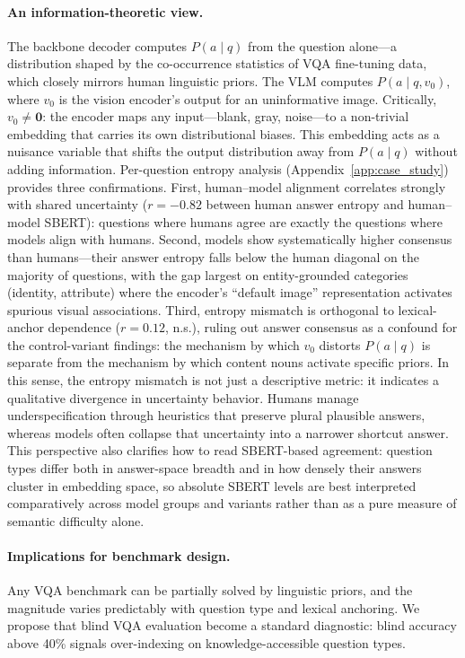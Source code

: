 \documentclass[letterpaper]{article}
\begin{document}
\paragraph{An information-theoretic view.}
The backbone decoder computes $P(a \mid q)$ from the question alone---a
distribution shaped by the co-occurrence statistics of VQA fine-tuning
data, which closely mirrors human linguistic priors. The VLM computes
$P(a \mid q, v_0)$, where $v_0$ is the vision encoder's output for an
uninformative image. Critically, $v_0 \neq \mathbf{0}$: the encoder maps
any input---blank, gray, noise---to a non-trivial embedding that
carries its own distributional biases. This embedding acts as a
nuisance variable that shifts the output distribution away from
$P(a \mid q)$ without adding information.
Per-question entropy analysis (Appendix~\ref{app:case_study}) provides
three confirmations. First, human--model alignment correlates strongly
with shared uncertainty ($r = -0.82$ between human answer entropy and
human--model SBERT): questions where humans agree are exactly the questions where
models align with humans. Second, models show systematically higher
consensus than humans---their answer entropy falls below the human
diagonal on the majority of questions, with the gap largest on
entity-grounded categories (identity, attribute) where the encoder's
``default image'' representation activates spurious visual associations.
Third, entropy mismatch is orthogonal to lexical-anchor dependence
($r = 0.12$, n.s.), ruling out answer consensus as a confound for the
control-variant findings: the mechanism by which $v_0$ distorts
$P(a \mid q)$ is separate from the mechanism by which content nouns
activate specific priors. In this sense, the entropy mismatch is not just a
descriptive metric: it indicates a qualitative divergence in uncertainty
behavior. Humans manage underspecification through heuristics that preserve
plural plausible answers, whereas models often collapse that uncertainty into
a narrower shortcut answer.
This perspective also clarifies how to read SBERT-based agreement: question
types differ both in answer-space breadth and in how densely their answers
cluster in embedding space, so absolute SBERT levels are best interpreted
comparatively across model groups and variants rather than as a pure measure
of semantic difficulty alone.

\paragraph{Implications for benchmark design.}
Any VQA benchmark can be partially solved by linguistic priors, and the
magnitude varies predictably with question type and lexical anchoring.
We propose that blind VQA evaluation become a standard diagnostic: blind
accuracy above 40\% signals over-indexing on knowledge-accessible
question types.
\end{document}
